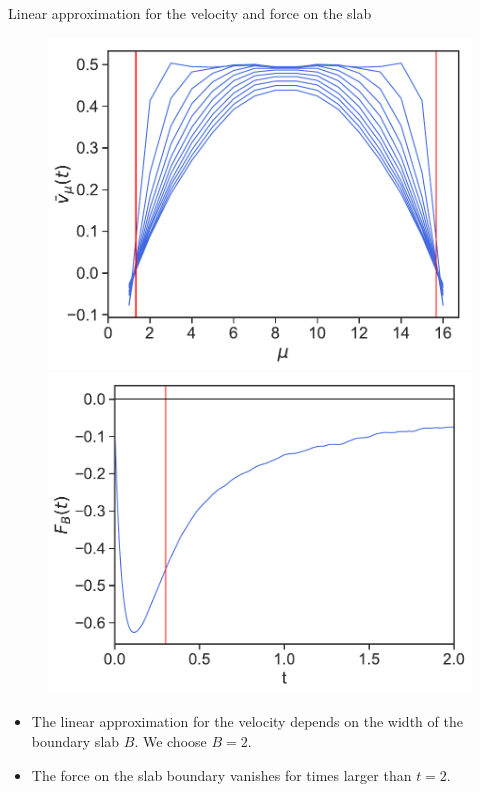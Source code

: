 \documentclass{beamer}
\begin{document}
\begin{frame}{Linear approximation for the velocity and force on the slab}
\begin{figure}[!h]
  \includegraphics[width=0.5\linewidth]{vtCorrected-17nodes-WALLS-defense}
  \includegraphics[width=0.5\linewidth]{checkMecBalance-17nodes-WALLS-defense}
\end{figure}
  \begin{itemize}
    \item The linear approximation for the velocity depends on the width of the boundary slab $B$. We choose $B=2$.\\
\item The force on the slab boundary vanishes for times larger than $t=2$.
  \end{itemize}
\end{frame}
\end{document}

